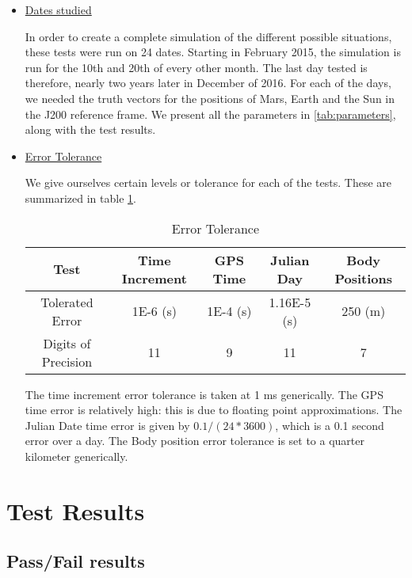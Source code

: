 \documentclass[]{BasiliskReportMemo}
\begin{document}
\begin{itemize}
\item \underline{Dates studied}

In order to create a complete simulation of the different possible situations, these tests were run on 24 dates. Starting in February 2015, the simulation is run for the 10th and 20th of every other month. The last day tested is therefore, nearly two years later in December of 2016. For each of the days, we needed the truth vectors for the positions of Mars, Earth and the Sun in the J200 reference frame. We present all the parameters in \ref{tab:parameters}, along with the test results. 

\item \underline{Error Tolerance}

We give ourselves certain levels or tolerance for each of the tests. These are summarized in table \ref{tab:errortol}. 

\begin{table}[htbp]
    \caption{Error Tolerance}
   \label{tab:errortol}
        \centering \fontsize{10}{10}\selectfont
   \begin{tabular}{| c | c | c | c | c |} %
      \hline
      Test   & Time Increment &GPS Time& Julian Day & Body Positions \\
      \hline
      Tolerated Error & 1E-6 (s) & 1E-4 (s) & 1.16E-5 (s) & 250 (m) \\
      \hline
      Digits of Precision & 11 & 9 & 11 & 7 \\
      \hline
   \end{tabular}
\end{table}

The time increment error tolerance is taken at 1 ms generically. The GPS time error is relatively high: this is due to floating point approximations. The Julian Date time error is given by $0.1/(24*3600)$, which is a 0.1 second error over a day.  The Body position error tolerance is set to a quarter kilometer generically. 


\end{itemize}

\section{Test Results}

\subsection{Pass/Fail results}
\end{document}
